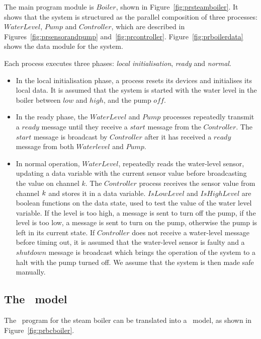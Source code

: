 The main program module is $Boiler$, shown in
Figure~\ref{fig:prsteamboiler}. It shows that the system is structured as the
parallel composition of three processes: $WaterLevel$, $Pump$ and
$Controller$, which are described in Figures~\ref{fig:prsensorandpump}
and~\ref{fig:prcontroller}. Figure~\ref{fig:prboilerdata} shows the
data module for the system.  

Each process executes three phases:
\emph{local initialisation}, \emph{ready} and \emph{normal}. 
\begin{itemize}
\item
In the local initialisation phase, a process resets its devices and
initialises its local data. It is assumed that the system is started
with the water level in the boiler between $low$ and $high$,
 and the pump $off$.
\item
In the ready phase, the $WaterLevel$ and $Pump$ processes repeatedly
transmit a $ready$ message until they receive a $start$ message from
the $Controller$. The $start$ message is broadcast by $Controller$
after it has received a $ready$ message from both $Waterlevel$ and
$Pump$.
\item
In normal operation, $WaterLevel$, repeatedly reads the water-level
sensor, updating a data variable with the current sensor value before
broadcasting the value on channel $k$. The $Controller$ process
receives the sensor value from channel ${k}$ and stores it in a data
variable. $IsLowLevel$ and $IsHighLevel$ are boolean functions on the
data state, used to test the value of the water level variable.  If
the level is too high, a message is sent to turn off the pump, if the
level is too low, a message is sent to turn on the pump, otherwise the
pump is left in its current state.  If $Controller$ does not receive a
water-level message before timing out, it is assumed that the water-level
sensor is faulty and a $shutdown$ message is broadcast which brings the
operation of the system to a halt with the pump turned off. We assume
that the system is then made safe manually.
\end{itemize}

\subsection{The \bcandle\ model}
The \candle\ program for the steam boiler can be translated into a
\bcandle\ model, as shown in Figure~\ref{fig:prbcboiler}. 

